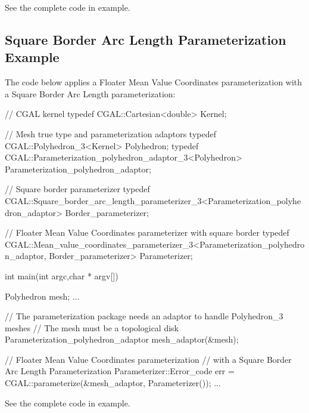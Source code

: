 See the complete code in  example.


\subsection{Square Border Arc Length Parameterization Example}

The code below applies a Floater Mean Value Coordinates parameterization
with a Square Border Arc Length parameterization:

\begin{ccExampleCode}

// CGAL kernel
typedef CGAL::Cartesian<double>                         Kernel;

// Mesh true type and parameterization adaptors
typedef CGAL::Polyhedron_3<Kernel>                      Polyhedron;
typedef CGAL::Parameterization_polyhedron_adaptor_3<Polyhedron>
                                                        Parameterization_polyhedron_adaptor;

// Square border parameterizer
typedef CGAL::Square_border_arc_length_parameterizer_3<Parameterization_polyhedron_adaptor>
                                                        Border_parameterizer;

// Floater Mean Value Coordinates parameterizer with square border
typedef CGAL::Mean_value_coordinates_parameterizer_3<Parameterization_polyhedron_adaptor,
                                                     Border_parameterizer>
                                                        Parameterizer;

int main(int argc,char * argv[])
{
    Polyhedron mesh;
    ...

    // The parameterization package needs an adaptor to handle Polyhedron_3 meshes
    // The mesh must be a topological disk
    Parameterization_polyhedron_adaptor mesh_adaptor(&mesh);

    // Floater Mean Value Coordinates parameterization
    // with a Square Border Arc Length Parameterization
    Parameterizer::Error_code err = CGAL::parameterize(&mesh_adaptor, Parameterizer());
    ...
}

\end{ccExampleCode}

See the complete code in  example.
